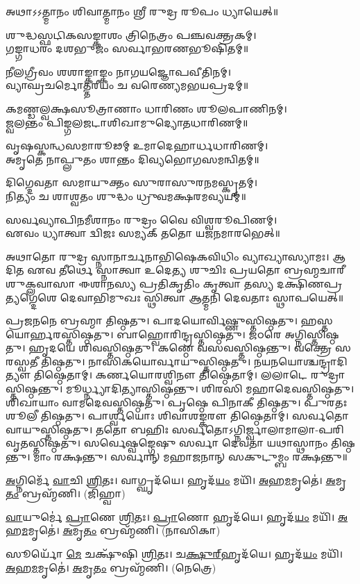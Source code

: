 
𑌅𑌥𑌾𑌽𑌽𑌤𑍍𑌮𑌾𑌨𑌂 𑌶𑌿𑌵𑌾𑌤𑍍𑌮𑌾𑌨𑌂 𑌶𑍍𑌰𑍀 𑌰𑍁𑌦𑍍𑌰 𑌰𑍂𑌪𑌂 𑌧𑍍𑌯𑌾𑌯𑍇𑌤𑍍॥

𑌶𑍁𑌦𑍍𑌧𑌸𑍍𑌫𑌟𑌿𑌕𑌸𑌙𑍍𑌕𑌾𑌶𑌂 𑌤𑍍𑌰𑌿𑌨𑍇𑌤𑍍𑌰𑌂 𑌪𑌞𑍍𑌚𑌵𑌕𑍍𑌤𑍍𑌰𑌕𑌮𑍍।\\
𑌗𑌙𑍍𑌗𑌾𑌧𑌰𑌂 𑌦𑌶𑌭𑍁𑌜𑌂 𑌸𑌰𑍍𑌵𑌾𑌭𑌰𑌣𑌭𑍂𑌷𑌿𑌤𑌮𑍍॥

𑌨𑍀𑌲𑌗𑍍𑌰𑍀𑌵𑌂 𑌶𑌶𑌾𑌙𑍍𑌕𑌾𑌙𑍍𑌕𑌂 𑌨𑌾𑌗𑌯𑌜𑍍𑌞𑍋𑌪𑌵𑍀𑌤𑌿𑌨𑌮𑍍।\\
𑌵𑍍𑌯𑌾𑌘𑍍𑌰𑌚𑌰𑍍𑌮𑍋𑌤𑍍𑌤𑌰𑍀𑌯𑌂 𑌚 𑌵𑌰𑍇𑌣𑍍𑌯𑌮𑌭𑌯𑌪𑍍𑌰𑌦𑌮𑍍॥

𑌕𑌮𑌣𑍍𑌡𑌲𑍍𑌵𑌕𑍍𑌷𑌸𑍂𑌤𑍍𑌰𑌾𑌣𑌾𑌂 𑌧𑌾𑌰𑌿𑌣𑌂 𑌶𑍂𑌲𑌪𑌾𑌣𑌿𑌨𑌮𑍍।\\
𑌜𑍍𑌵𑌲𑌨𑍍𑌤𑌂 𑌪𑌿𑌙𑍍𑌗𑌲𑌜𑌟𑌾𑌶𑌿𑌖𑌾𑌮𑍁𑌦𑍍𑌯𑍋𑌤𑌧𑌾𑌰𑌿𑌣𑌮𑍍॥

𑌵𑍃𑌷𑌸𑍍𑌕𑌨𑍍𑌧𑌸𑌮𑌾𑌰𑍂𑌢𑌮𑍍 𑌉𑌮𑌾𑌦𑍇𑌹𑌾𑌰𑍍𑌧𑌧𑌾𑌰𑌿𑌣𑌮𑍍।\\
𑌅𑌮𑍃𑌤𑍇  𑌨𑌾𑌪𑍍𑌲𑍁𑌤𑌂 𑌶𑌾𑌨𑍍𑌤𑌂 𑌦𑌿𑌵𑍍𑌯𑌭𑍋𑌗𑌸𑌮𑌨𑍍𑌵𑌿𑌤𑌮𑍍॥

𑌦𑌿𑌗𑍍𑌦𑍇𑌵𑌤𑌾 𑌸𑌮𑌾𑌯𑍁𑌕𑍍𑌤𑌂 𑌸𑍁𑌰𑌾𑌸𑍁𑌰𑌨𑌮𑌸𑍍𑌕𑍃𑌤𑌮𑍍।\\
𑌨𑌿𑌤𑍍𑌯𑌂 𑌚 𑌶𑌾𑌶𑍍𑌵𑌤𑌂 𑌶𑍁𑌦𑍍𑌧𑌂 𑌧𑍍𑌰𑍁𑌵𑌮𑌕𑍍𑌷𑌰𑌮𑌵𑍍𑌯𑌯𑌮𑍍॥

𑌸𑌰𑍍𑌵𑌵𑍍𑌯𑌾𑌪𑌿𑌨𑌮𑍀𑌶𑌾𑌨𑌂 𑌰𑍁𑌦𑍍𑌰𑌂 𑌵𑍈 𑌵𑌿𑌶𑍍𑌵𑌰𑍂𑌪𑌿𑌣𑌮𑍍।\\
𑌏𑌵𑌂 𑌧𑍍𑌯𑌾𑌤𑍍𑌵𑌾 𑌦𑍍𑌵𑌿𑌜𑌃 𑌸𑌮𑍍𑌯𑌕𑍍 𑌤𑌤𑍋 𑌯𑌜𑌨𑌮𑌾𑌰𑌭𑍇𑌤𑍍॥

𑌅𑌥𑌾𑌤𑍋 𑌰𑍁𑌦𑍍𑌰 𑌸𑍍𑌨𑌾𑌨𑌾𑌰𑍍𑌚𑌨𑌾𑌭𑌿𑌷𑍇𑌕𑌵𑌿𑌧𑌿𑌂 𑌵𑍍𑌯𑌾𑌖𑍍𑌯𑌾𑌸𑍍𑌯𑌾𑌮𑌃। 𑌆𑌦𑌿𑌤 𑌏𑌵 𑌤𑍀𑌰𑍍𑌥𑍇 𑌸𑍍𑌨𑌾𑌤𑍍𑌵𑌾 𑌉𑌦𑍇𑌤𑍍𑌯 𑌶𑍁𑌚𑌿𑌃
𑌪𑍍𑌰𑌯𑌤𑍋 𑌬𑍍𑌰𑌹𑍍𑌮𑌚𑌾𑌰𑍀 𑌶𑍁𑌕𑍍𑌲𑌵𑌾𑌸𑌾 𑌈𑌶𑌾𑌨𑌸𑍍𑌯 𑌪𑍍𑌰𑌤𑌿𑌕𑍃𑌤𑌿𑌂 𑌕𑍃𑌤𑍍𑌵𑌾 𑌤𑌸𑍍𑌯 𑌦𑌕𑍍𑌷𑌿𑌣𑌪𑍍𑌰𑌤𑍍𑌯𑌗𑍍𑌦𑍇𑌶𑍇 𑌦𑍇𑌵𑌾𑌭𑌿𑌮𑍁𑌖𑌃 𑌸𑍍𑌥𑌿𑌤𑍍𑌵𑌾 𑌆𑌤𑍍𑌮𑌨𑌿 𑌦𑍇𑌵𑌤𑌾𑌃 𑌸𑍍𑌥𑌾𑌪𑌯𑍇𑌤𑍍॥

𑌪𑍍𑌰𑌜𑌨𑌨𑍇 𑌬𑍍𑌰𑌹𑍍𑌮𑌾 𑌤𑌿𑌷𑍍𑌠𑌤𑍁। 𑌪𑌾𑌦𑌯𑍋𑌰𑍍𑌵𑌿𑌷𑍍𑌣𑍁𑌸𑍍𑌤𑌿𑌷𑍍𑌠𑌤𑍁। 
𑌹𑌸𑍍𑌤𑌯𑍋𑌰𑍍𑌹𑌰𑌸𑍍𑌤𑌿𑌷𑍍𑌠𑌤𑍁। 𑌬𑌾𑌹𑍍𑌵𑍋𑌰𑌿𑌨𑍍𑌦𑍍𑌰𑌸𑍍𑌤𑌿𑌷𑍍𑌠𑌤𑍁। 
𑌜𑌠𑌰𑍇 𑌅𑌗𑍍𑌨𑌿𑌸𑍍𑌤𑌿𑌷𑍍𑌠𑌤𑍁। 𑌹𑍃𑌦𑌯𑍇 𑌶𑌿𑌵𑌸𑍍𑌤𑌿𑌷𑍍𑌠𑌤𑍁। 
𑌕𑌣𑍍𑌠𑍇 𑌵𑌸𑌵𑌸𑍍𑌤𑌿𑌷𑍍𑌠𑌨𑍍𑌤𑍁। 𑌵𑌕𑍍𑌤𑍍𑌰𑍇 𑌸𑌰𑌸𑍍𑌵𑌤𑍀 𑌤𑌿𑌷𑍍𑌠𑌤𑍁। 
𑌨𑌾𑌸𑌿𑌕𑌯𑍋𑌰𑍍\-𑌵𑌾𑌯𑍁𑌸𑍍𑌤𑌿𑌷𑍍𑌠𑌤𑍁। 𑌨𑌯𑌨𑌯𑍋𑌶𑍍𑌚𑌨𑍍𑌦𑍍𑌰𑌾𑌦𑌿𑌤𑍍𑌯𑍗 𑌤𑌿𑌷𑍍𑌠𑍇𑌤𑌾𑌮𑍍। 
𑌕𑌰𑍍𑌣𑌯𑍋𑌰𑌶𑍍𑌵𑌿𑌨𑍗 𑌤𑌿𑌷𑍍𑌠𑍇𑌤𑌾𑌮𑍍। 𑌲𑌲𑌾𑌟𑍇 𑌰𑍁𑌦𑍍𑌰𑌾𑌸𑍍𑌤𑌿𑌷𑍍𑌠𑌨𑍍𑌤𑍁। 
𑌮𑍂𑌰𑍍𑌧𑍍𑌨𑍍𑌯𑌾𑌦𑌿𑌤𑍍𑌯𑌾𑌸𑍍𑌤𑌿𑌷𑍍𑌠𑌨𑍍𑌤𑍁। 𑌶𑌿𑌰𑌸𑌿 𑌮𑌹𑌾𑌦𑍇𑌵𑌸𑍍𑌤𑌿𑌷𑍍𑌠𑌤𑍁। 
𑌶𑌿𑌖𑌾𑌯𑌾𑌂 𑌵𑌾𑌮𑌦𑍇𑌵𑌸𑍍𑌤𑌿𑌷𑍍𑌠𑌤𑍁। 𑌪𑍃𑌷𑍍𑌠𑍇 𑌪𑌿𑌨𑌾𑌕𑍀 𑌤𑌿𑌷𑍍𑌠𑌤𑍁। 
𑌪𑍁𑌰𑌤𑌃 𑌶𑍂𑌲𑍀 𑌤𑌿𑌷𑍍𑌠𑌤𑍁। 𑌪𑌾𑌰𑍍𑌶𑍍𑌵𑌯𑍋𑌃 𑌶𑌿𑌵𑌾𑌶𑌙𑍍𑌕𑌰𑍗 𑌤𑌿𑌷𑍍𑌠𑍇𑌤𑌾𑌮𑍍। 
𑌸𑌰𑍍𑌵𑌤𑍋 𑌵𑌾𑌯𑍁𑌸𑍍𑌤𑌿𑌷𑍍𑌠𑌤𑍁। 𑌤𑌤𑍋 𑌬𑌹𑌿𑌃 𑌸𑌰𑍍𑌵𑌤𑍋𑌽𑌗𑍍𑌨𑌿𑌰𑍍𑌜𑍍𑌵𑌾𑌲𑌾𑌮𑌾𑌲𑌾-𑌪𑌰𑌿𑌵𑍃𑌤𑌸𑍍𑌤𑌿𑌷𑍍𑌠𑌤𑍁।
𑌸𑌰𑍍𑌵𑍇𑌷𑍍𑌵𑌙𑍍𑌗𑍇𑌷𑍁 𑌸𑌰𑍍𑌵𑌾 𑌦𑍇𑌵𑌤𑌾 𑌯𑌥𑌾𑌸𑍍𑌥𑌾𑌨𑌂 𑌤𑌿𑌷𑍍𑌠𑌨𑍍𑌤𑍁। 𑌮𑌾𑌂 𑌰𑌕𑍍𑌷𑌨𑍍𑌤𑍁।
\lbrack 𑌸𑌰𑍍𑌵𑌾𑌨𑍍 𑌮𑌹𑌾𑌜𑌨𑌾𑌨𑍍 𑌸𑌕𑍁𑌟𑍁𑌮𑍍𑌬𑌂 𑌰𑌕𑍍𑌷𑌨𑍍𑌤𑍁॥\rbrack

\-\ul{𑌅}\-𑌗𑍍𑌨𑌿𑌰𑍍𑌮𑍇᳴ \ul{𑌵𑌾}\-𑌚𑌿 \ul{𑌶𑍍𑌰𑌿}\-𑌤𑌃।   𑌵𑌾𑌗𑍍𑌘𑍃𑌦᳴𑌯𑍇।   𑌹𑍃𑌦᳴\-\ul{𑌯𑌂} 𑌮𑌯𑌿᳴।   \ul{𑌅}\-𑌹\-\ul{𑌮}\-𑌮𑍃𑌤𑍇॑।   \ul{𑌅}\-𑌮𑍃\-\ul{𑌤𑌂} 𑌬𑍍𑌰𑌹𑍍𑌮᳴𑌣𑌿। (𑌜𑌿𑌹𑍍𑌵𑌾)

 \ul{𑌵𑌾}\-𑌯𑍁𑌰𑍍𑌮𑍇॑ \ul{𑌪𑍍𑌰𑌾}\-𑌣𑍇 \ul{𑌶𑍍𑌰𑌿}\-𑌤𑌃।   \ul{𑌪𑍍𑌰𑌾}\-𑌣𑍋 𑌹𑍃𑌦᳴𑌯𑍇।   𑌹𑍃𑌦᳴\-\ul{𑌯𑌂} 𑌮𑌯𑌿᳴।   \ul{𑌅}\-𑌹\-\ul{𑌮}\-𑌮𑍃𑌤𑍇॑।   \ul{𑌅}\-𑌮𑍃\-\ul{𑌤𑌂} 𑌬𑍍𑌰𑌹𑍍𑌮᳴𑌣𑌿। (𑌨𑌾𑌸𑌿𑌕𑌾)

   𑌸𑍂𑌰𑍍𑌯𑍋᳴ \ul{𑌮𑍇} 𑌚𑌕𑍍𑌷𑍁᳴𑌷𑌿 \ul{𑌶𑍍𑌰𑌿}\-𑌤𑌃।   𑌚\-\ul{𑌕𑍍𑌷𑍁}\-\-\ul{𑌰𑍍}\-‌𑌹𑍃𑌦᳴𑌯𑍇।   𑌹𑍃𑌦᳴\-\ul{𑌯𑌂} 𑌮𑌯𑌿᳴।   \ul{𑌅}\-𑌹\-\ul{𑌮}\-𑌮𑍃𑌤𑍇॑।   \ul{𑌅}\-𑌮𑍃\-\ul{𑌤𑌂} 𑌬𑍍𑌰𑌹𑍍𑌮᳴𑌣𑌿। (𑌨𑍇𑌤𑍍𑌰𑍇)

